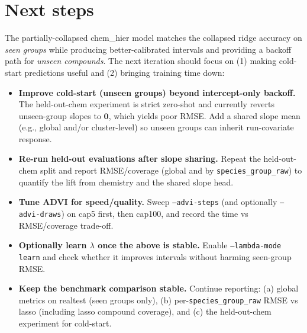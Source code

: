 \documentclass[11pt]{article}
\begin{document}
\section{Next steps}

The partially-collapsed chem\_hier model matches the collapsed ridge accuracy on \emph{seen groups} while producing better-calibrated
intervals and providing a backoff path for \emph{unseen compounds}. The next iteration should focus on (1) making cold-start predictions
useful and (2) bringing training time down:
\begin{itemize}
  \item \textbf{Improve cold-start (unseen groups) beyond intercept-only backoff.}
        The held-out-chem experiment is strict zero-shot and currently reverts unseen-group slopes to $\bm{0}$, which yields poor RMSE.
        Add a shared slope mean (e.g., global and/or cluster-level) so unseen groups can inherit run-covariate response.
  \item \textbf{Re-run held-out evaluations after slope sharing.}
        Repeat the held-out-chem split and report RMSE/coverage (global and by \texttt{species\_group\_raw}) to quantify the lift from
        chemistry and the shared slope head.
  \item \textbf{Tune ADVI for speed/quality.}
        Sweep \texttt{--advi-steps} (and optionally \texttt{--advi-draws}) on cap5 first, then cap100, and record the time vs RMSE/coverage
        trade-off.
  \item \textbf{Optionally learn $\lambda$ once the above is stable.}
        Enable \texttt{--lambda-mode learn} and check whether it improves intervals without harming seen-group RMSE.
  \item \textbf{Keep the benchmark comparison stable.}
        Continue reporting: (a) global metrics on realtest (seen groups only), (b) per-\texttt{species\_group\_raw} RMSE vs lasso
        (including lasso compound coverage), and (c) the held-out-chem experiment for cold-start.
\end{itemize}
\end{document}
